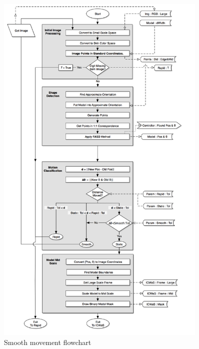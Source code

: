 \begin{figure}[h!]
  \centering
    \includegraphics[width=0.90\textwidth]{Chapter4/Figs/Fingerpress_Smooth_Movement.jpg}
    \caption{Smooth movement flowchart}\label{fig:FingerpressSmoothMovement}
\end{figure}

